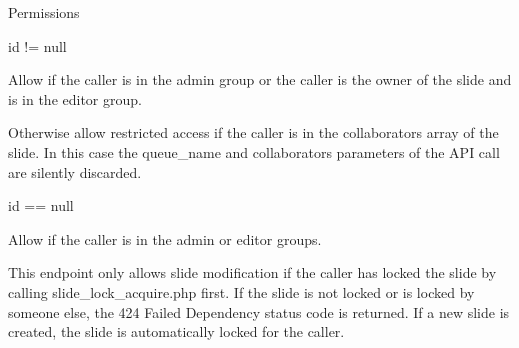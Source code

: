 Permissions
\begin{DoxyItemize}
\item {\ttfamily id} != null
\begin{DoxyItemize}
\item Allow if the caller is in the admin group or the caller is the owner of the slide and is in the editor group.
\item Otherwise allow restricted access if the caller is in the collaborators array of the slide. In this case the queue\+\_\+name and collaborators parameters of the A\+PI call are silently discarded.
\end{DoxyItemize}
\item {\ttfamily id} == null
\begin{DoxyItemize}
\item Allow if the caller is in the admin or editor groups.
\end{DoxyItemize}
\end{DoxyItemize}

This endpoint only allows slide modification if the caller has locked the slide by calling {\ttfamily slide\+\_\+lock\+\_\+acquire.\+php} first. If the slide is not locked or is locked by someone else, the \textquotesingle{}424 Failed Dependency\textquotesingle{} status code is returned. If a new slide is created, the slide is automatically locked for the caller.

